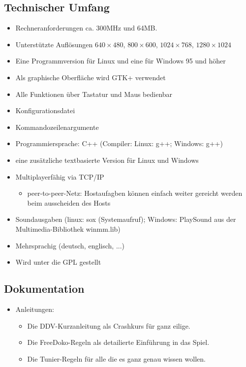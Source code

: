 \documentclass[12pt,a4paper]{article}
\begin{document}
\subsection{Technischer Umfang}
\begin{itemize}
\item Rechneranforderungen ca. 300MHz und 64MB.
\item Unterstützte Auflösungen $640\times 480$, $800\times 600$, $1024\times 768$, $1280\times 1024$
\item Eine Programmversion für Linux und eine für Windows 95 und höher
\item Als graphische Oberfläche wird GTK+ verwendet
\item Alle Funktionen über Tastatur und Maus bedienbar
\item Konfigurationsdatei
\item Kommandozeilenargumente
\item Programmiersprache: C++ (Compiler: Linux: g++; Windows: g++)
\item eine zusätzliche textbasierte Version für Linux und Windows
\item Multiplayerfähig via TCP/IP
\begin{itemize}
\item peer-to-peer-Netz: Hostaufagben können einfach weiter gereicht werden beim ausscheiden des Hosts
\end{itemize}
\item Soundausgaben (linux: sox (Systemaufruf); Windows: PlaySound aus der Multimedia-Bibliothek winmm.lib)
\item Mehrsprachig (deutsch, englisch, ...)
\item Wird unter die GPL gestellt
\end{itemize}
\subsection{Dokumentation}
\begin{itemize}
\item Anleitungen:
\begin{itemize}
\item Die DDV-Kurzanleitung als Crashkurs für ganz eilige.
\item Die FreeDoko-Regeln als detailierte Einführung in das Spiel.
\item Die Tunier-Regeln für alle die es ganz genau wissen wollen.
\end{itemize}
\end{itemize}
\end{document}
